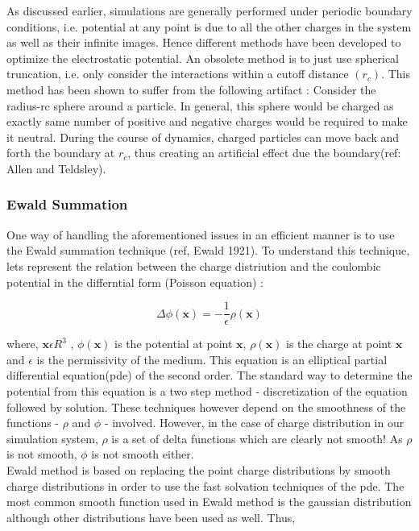 \documentclass[9pt,bestpractices]{livecoms}
\begin{document}
As discussed earlier, simulations are generally performed under periodic boundary conditions, i.e. potential at any point is due to all the other charges in the system as well as their infinite images. Hence different methods have been developed to optimize the electrostatic potential. An obsolete method is to just use spherical truncation, i.e. only consider the interactions within a cutoff distance $(r_c)$. This method has been shown to suffer from the following artifact : Consider the radius-rc sphere around a particle. In general, this sphere would be charged as exactly same number of positive and negative charges would be required to make it neutral. During the course of dynamics, charged particles can move back and forth the boundary at $r_c$, thus creating an artificial effect due the boundary(ref: Allen and Teldsley).  

\subsubsection{ Ewald Summation}

One way of handling the aforementioned issues in an efficient manner is to use the Ewald summation technique (ref, Ewald 1921). To understand this technique, lets represent the relation between the charge distriution and the coulombic potential  in the differntial form (Poisson equation) :

\[
\Delta \phi(\boldsymbol{x}) = - \frac{1}{\epsilon} \rho(\boldsymbol{x}) 
\] 

where,  $ \boldsymbol{x} \epsilon R^3 $ ,  $\phi(\boldsymbol{x})$ is the potential at point $\boldsymbol{x}$, $\rho(\boldsymbol{x})$ is the charge at point $\boldsymbol{x}$ and $\epsilon$ is the permissivity of the medium. This equation is an elliptical partial differential equation(pde) of the second order. The standard way to determine the potential from this equation is a two step method - discretization of the equation followed by solution. These techniques however depend on the smoothness of the functions - $\rho$ and $\phi$ - involved. However, in the case of charge distribution in our simulation system, $\rho$ is a set of delta functions which are clearly not smooth! As $\rho$ is not smooth, $\phi$ is not smooth either. \\

   
Ewald method is based on replacing the point charge distributions by smooth charge distributions in order to use the fast solvation techniques of the pde. The most common smooth function used in Ewald method is the gaussian distribution although other distributions have been used as well. Thus,
\end{document}
